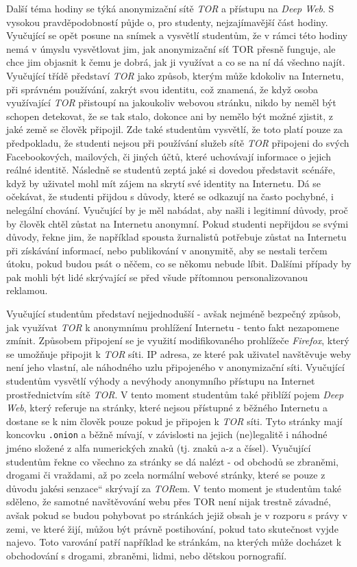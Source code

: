 \documentclass[a4paper, 12pt]{article}
\providecommand{\uv}[1]{\quotedblbase #1\textquotedblleft}
\begin{document}
Další téma hodiny se týká anonymizační sítě \textit{TOR} a přístupu na \textit{Deep Web}. S vysokou pravděpodobností půjde o, pro studenty, nejzajímavější část hodiny. Vyučující se opět posune na snímek a vysvětlí studentům, že v rámci této hodiny nemá v úmyslu vysvětlovat jim, jak anonymizační síť TOR přesně funguje, ale chce jim objasnit k čemu je dobrá, jak ji využívat a co se na ní dá všechno najít. Vyučující třídě představí \textit{TOR} jako způsob, kterým může kdokoliv na Internetu, při správném používání, zakrýt svou identitu, což znamená, že když osoba využívající \textit{TOR} přistoupí na jakoukoliv webovou stránku, nikdo by neměl být schopen detekovat, že se tak stalo, dokonce ani by nemělo být možné zjistit, z jaké země se člověk připojil. Zde také studentům vysvětlí, že toto platí pouze za předpokladu, že studenti nejsou při používání služeb sítě \textit{TOR} připojeni do svých Facebookových, mailových, či jiných účtů, které uchovávají informace o jejich reálné identitě. Následně se studentů zeptá jaké si dovedou představit scénáře, když by uživatel mohl mít zájem na skrytí své identity na Internetu. Dá se očekávat, že studenti přijdou s důvody, které se odkazují na často pochybné, i nelegální chování. Vyučující by je měl nabádat, aby našli i legitimní důvody, proč by člověk chtěl zůstat na Internetu anonymní. Pokud studenti nepřijdou se svými důvody, řekne jim, že například spousta žurnalistů potřebuje zůstat na Internetu při získávání informací, nebo publikování v anonymitě, aby se nestali terčem útoku, pokud budou psát o něčem, co se někomu nebude líbit. Dalšími případy by pak mohli být lidé skrývající se před všude přítomnou personalizovanou reklamou.

Vyučující studentům představí nejjednodušší - avšak nejméně bezpečný způsob, jak využívat \textit{TOR} k anonymnímu prohlížení Internetu - tento fakt nezapomene zmínit. Způsobem připojení se je využití modifikovaného prohlížeče \textit{Firefox}, který se umožňuje připojit k \textit{TOR} síti. IP adresa, ze které pak uživatel navštěvuje weby není jeho vlastní, ale náhodného uzlu připojeného v anonymizační síti. Vyučující studentům vysvětlí výhody a nevýhody anonymního přístupu na Internet prostřednictvím sítě \textit{TOR}. V tento moment studentům také přiblíží pojem \textit{Deep Web}, který referuje na stránky, které nejsou přístupné z běžného Internetu a dostane se k nim člověk pouze pokud je připojen k \textit{TOR} síti. Tyto stránky mají koncovku \texttt{.onion} a běžně mívají, v závislosti na jejich (ne)legalitě i náhodné jméno složené z alfa numerických znaků (tj. znaků a-z a čísel). Vyučující studentům řekne co všechno za stránky se dá nalézt - od obchodů se zbraněmi, drogami či vraždami, až po zcela normální webové stránky, které se pouze z důvodu jakési \uv{senzace} skrývají za \textit{TOR}em. V tento moment je studentům také sděleno, že samotné navštěvování webu přes TOR není nijak trestně závadné, avšak pokud se budou pohybovat po stránkách jejiž obsah je v rozporu s právy v zemi, ve které žijí, můžou být právně postihování, pokud tato skutečnost vyjde najevo. Toto varování patří například ke stránkám, na kterých může docházet k obchodování s drogami, zbraněmi, lidmi, nebo dětskou pornografií.
\end{document}
